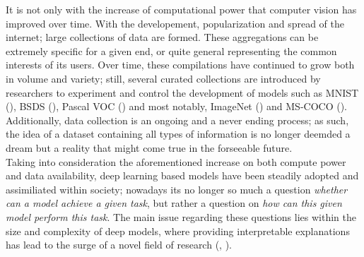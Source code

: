 \noindent It is not only with the increase of computational power that computer vision has improved over time. 
With the developement, popularization and spread of the internet; large collections of data are 
formed. These aggregations can be extremely specific for a given end, or 
quite general representing the common interests of its users. Over time, these compilations have 
continued to grow both in volume and variety; still, several curated collections are introduced by 
researchers to experiment and control the development of models such as MNIST (\cite{lecun1998gradient}),
BSDS (\cite{MartinFTM01}), Pascal VOC (\cite{pascal-voc-2012}) and most notably, 
ImageNet (\cite{ILSVRC15}) and MS-COCO (\cite{lin2014microsoft}). Additionally, data collection is
an ongoing and a never ending process; as such, the idea of a dataset containing all types of 
information is no longer deemded a dream but a reality that might come true in the forseeable future.\\

\noindent Taking into consideration the aforementioned  increase on  both compute power and data 
availability, deep learning based models have been steadily adopted and assimiliated within society; 
nowadays its no longer so much a question \textit{whether can a model achieve a given task}, but 
rather a question on \textit{how can this given model perform this task}. The main issue regarding 
these questions lies within the size and complexity of deep models, where providing interpretable 
explanations has lead to the surge of a novel field of research (\cite{guidotti2018survey}, 
\cite{bodria2021benchmarking}).

